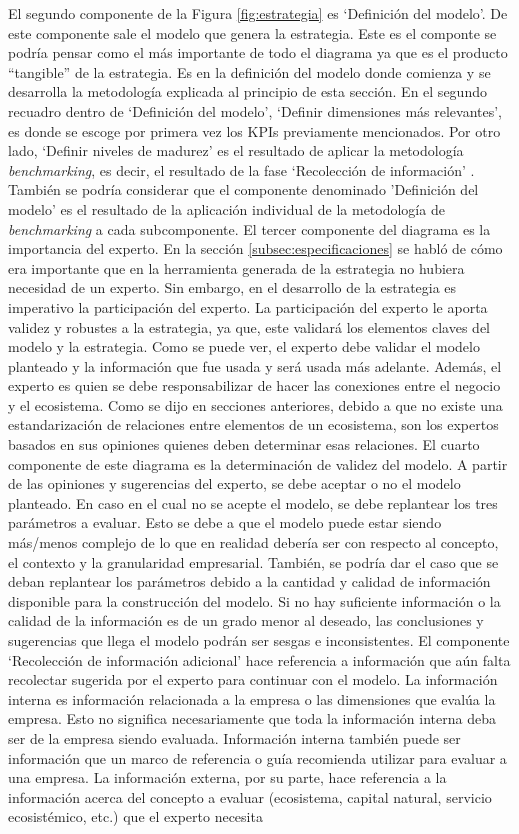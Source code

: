 El segundo componente de la Figura \ref{fig:estrategia} es ‘Definición del modelo’. De este componente sale el modelo que genera la estrategia. Este es el componte se podría pensar como el más importante de todo el diagrama ya que es el producto “tangible” de la estrategia. Es en la definición del modelo donde comienza y se desarrolla la metodología explicada al principio de esta sección. En el segundo recuadro dentro de ‘Definición del modelo’, ‘Definir dimensiones más relevantes’, es donde se escoge por primera vez los KPIs previamente mencionados.  Por otro lado, ‘Definir niveles de madurez’ es el resultado de aplicar la metodología \textit{benchmarking}, es decir, el resultado de la fase ‘Recolección de información’ . También se podría considerar que el componente denominado 'Definición del modelo' es el resultado de la aplicación individual de la metodología de \textit{benchmarking} a cada subcomponente. El tercer componente del diagrama es la importancia del experto. En la sección \ref{subsec:especificaciones}  se habló de cómo era importante que en la herramienta generada de la estrategia no hubiera necesidad de un experto. Sin embargo, en el desarrollo de la estrategia es imperativo la participación del experto. La participación del experto le aporta validez y robustes a la estrategia, ya que, este validará los elementos claves del modelo y la estrategia. Como se puede ver, el experto debe validar el modelo planteado y la información que fue usada y será usada más adelante. Además, el experto es quien se debe responsabilizar de hacer las conexiones entre el negocio y el ecosistema. Como se dijo en secciones anteriores, debido a que no existe una estandarización de relaciones entre elementos de un ecosistema, son los expertos basados en sus opiniones quienes deben determinar esas relaciones. El cuarto componente de este diagrama es la determinación de validez del modelo. A partir de las opiniones y sugerencias del experto, se debe aceptar o no el modelo planteado. En caso en el cual no se acepte el modelo, se debe replantear los tres parámetros a evaluar. Esto se debe a que el modelo puede estar siendo más/menos complejo de lo que en realidad debería ser con respecto al concepto, el contexto y la granularidad empresarial. También, se podría dar el caso que se deban replantear los parámetros debido a la cantidad y calidad de información disponible para la construcción del modelo. Si no hay suficiente información o la calidad de la información es de un grado menor al deseado, las conclusiones y sugerencias que llega el modelo podrán ser sesgas e inconsistentes. El componente ‘Recolección de información adicional’ hace referencia a información que aún falta recolectar sugerida por el experto para continuar con el modelo. La información interna es información relacionada a la empresa o las dimensiones que evalúa la empresa. Esto no significa necesariamente que toda la información interna deba ser de la empresa siendo evaluada. Información interna también puede ser información que un marco de referencia o guía recomienda utilizar para evaluar a una empresa. La información externa, por su parte, hace referencia a la información acerca del concepto a evaluar (ecosistema, capital natural, servicio ecosistémico, etc.) que el experto necesita 